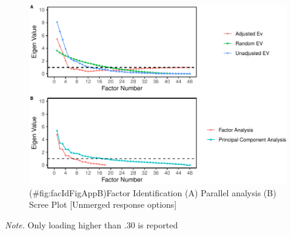 \begin{appendix}
\begin{center}
\begin{ThreePartTable}
\end{ThreePartTable}
\end{center}

\begin{figure}
\centering
\includegraphics{manuscript_files/figure-latex/facIdFigAppB-1.pdf}
\caption{(\#fig:facIdFigAppB)Factor Identification (A) Parallel analysis
(B) Scree Plot {[}Unmerged response options{]}}
\end{figure}

\begin{center}
\begin{ThreePartTable}

\begin{TableNotes}[para]
\normalsize{\textit{Note.} Only loading higher than .30 is reported}
\end{TableNotes}


\end{ThreePartTable}
\end{center}
\end{appendix}
